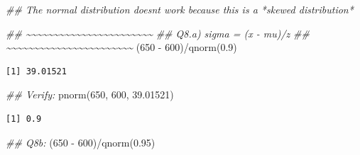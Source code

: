 \documentclass[
  letterpaper,
  DIV=11,
  numbers=noendperiod,
  oneside]{scrreprt}
\newenvironment{Shaded}{\begin{snugshade}}{\end{snugshade}}
\newcommand{\DecValTok}[1]{\textcolor[rgb]{0.68,0.00,0.00}{#1}}
\newcommand{\DocumentationTok}[1]{\textcolor[rgb]{0.37,0.37,0.37}{\textit{#1}}}
\newcommand{\FloatTok}[1]{\textcolor[rgb]{0.68,0.00,0.00}{#1}}
\newcommand{\FunctionTok}[1]{\textcolor[rgb]{0.28,0.35,0.67}{#1}}
\newcommand{\NormalTok}[1]{\textcolor[rgb]{0.00,0.23,0.31}{#1}}
\newcommand{\SpecialCharTok}[1]{\textcolor[rgb]{0.37,0.37,0.37}{#1}}
\begin{document}
\begin{Shaded}
\begin{Highlighting}[]
\DocumentationTok{\#\# The normal distribution doesn\textquotesingle{}t work because this is a *skewed distribution*}

\DocumentationTok{\#\# \textasciitilde{}\textasciitilde{}\textasciitilde{}\textasciitilde{}\textasciitilde{}\textasciitilde{}\textasciitilde{}\textasciitilde{}\textasciitilde{}\textasciitilde{}\textasciitilde{}\textasciitilde{}\textasciitilde{}\textasciitilde{}\textasciitilde{}\textasciitilde{}\textasciitilde{}\textasciitilde{}\textasciitilde{}\textasciitilde{}\textasciitilde{}\textasciitilde{}\textasciitilde{}}
\DocumentationTok{\#\# Q8.a) sigma = (x {-} mu)/z}
\DocumentationTok{\#\# \textasciitilde{}\textasciitilde{}\textasciitilde{}\textasciitilde{}\textasciitilde{}\textasciitilde{}\textasciitilde{}\textasciitilde{}\textasciitilde{}\textasciitilde{}\textasciitilde{}\textasciitilde{}\textasciitilde{}\textasciitilde{}\textasciitilde{}\textasciitilde{}\textasciitilde{}\textasciitilde{}\textasciitilde{}\textasciitilde{}\textasciitilde{}\textasciitilde{}\textasciitilde{}}
\NormalTok{(}\DecValTok{650} \SpecialCharTok{{-}} \DecValTok{600}\NormalTok{)}\SpecialCharTok{/}\FunctionTok{qnorm}\NormalTok{(}\FloatTok{0.9}\NormalTok{)}
\end{Highlighting}
\end{Shaded}

\begin{verbatim}
[1] 39.01521
\end{verbatim}

\begin{Shaded}
\begin{Highlighting}[]
\DocumentationTok{\#\# Verify:}
\FunctionTok{pnorm}\NormalTok{(}\DecValTok{650}\NormalTok{, }\DecValTok{600}\NormalTok{, }\FloatTok{39.01521}\NormalTok{)}
\end{Highlighting}
\end{Shaded}

\begin{verbatim}
[1] 0.9
\end{verbatim}

\begin{Shaded}
\begin{Highlighting}[]
\DocumentationTok{\#\# Q8b:}
\NormalTok{(}\DecValTok{650} \SpecialCharTok{{-}} \DecValTok{600}\NormalTok{)}\SpecialCharTok{/}\FunctionTok{qnorm}\NormalTok{(}\FloatTok{0.95}\NormalTok{)}
\end{Highlighting}
\end{Shaded}
\end{document}
